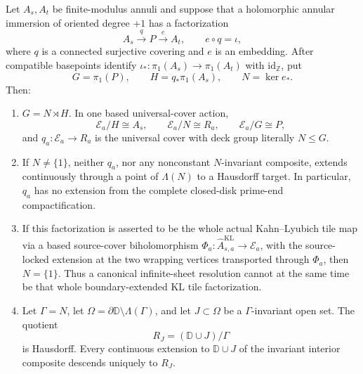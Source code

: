 \begin{theorem}\label{thm:resolved-boundary-obstruction}
Let \(A_s,A_t\) be finite-modulus annuli and suppose that a holomorphic annular immersion of oriented degree \(+1\) has a factorization
\[
A_s\xrightarrow{\ q\ }P\xrightarrow{\ e\ }A_t,\qquad e\circ q=\iota,
\]
where \(q\) is a connected surjective covering and \(e\) is an embedding. After compatible basepoints identify \(\iota_*:\pi_1(A_s)\to\pi_1(A_t)\) with \(\mathrm{id}_{\mathbb Z}\), put
\[
G=\pi_1(P),\qquad H=q_*\pi_1(A_s),\qquad N=\ker e_* .
\]
Then:
\begin{enumerate}
\item \(G=N\rtimes H\). In one based universal-cover action,
\[
\mathcal E_a/H\cong A_s,\qquad \mathcal E_a/N\cong R_a,\qquad \mathcal E_a/G\cong P, \tag{10.55}
\]
and \(q_a:\mathcal E_a\to R_a\) is the universal cover with deck group literally \(N\le G\).
\item If \(N\neq\{1\}\), neither \(q_a\), nor any nonconstant \(N\)-invariant composite, extends continuously through a point of \(\Lambda(N)\) to a Hausdorff target. In particular, \(q_a\) has no extension from the complete closed-disk prime-end compactification.
\item If this factorization is asserted to be the whole actual Kahn--Lyubich tile map via a based source-cover biholomorphism \(\Phi_a:\hat A^{\mathrm{KL}}_{s,a}\to\mathcal E_a\), with the source-locked extension at the two wrapping vertices transported through \(\Phi_a\), then \(N=\{1\}\). Thus a canonical infinite-sheet resolution cannot at the same time be that whole boundary-extended KL tile factorization.
\item Let \(\Gamma=N\), let \(\Omega=\partial\mathbb D\setminus\Lambda(\Gamma)\), and let \(J\subset\Omega\) be a \(\Gamma\)-invariant open set. The quotient
\[
R_J=(\mathbb D\cup J)/\Gamma \tag{10.56}
\]
is Hausdorff. Every continuous extension to \(\mathbb D\cup J\) of the invariant interior composite descends uniquely to \(R_J\).
\end{enumerate}
\end{theorem}

